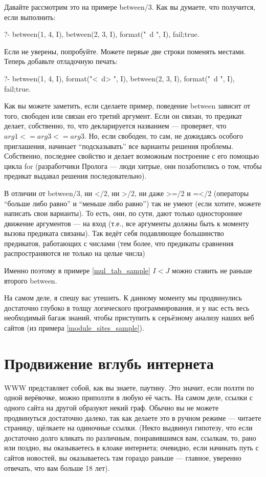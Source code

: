 \documentclass[a4paper]{book}
\def\te{т.\thinspace е.}
\begin{document}
Давайте рассмотрим это на примере between/3. Как вы думаете, что
получится, если выполнить:

\begin{example}{}{}
?-  between(1, 4, I), 
    between(2, 3, I), 
    format("~d ", I), 
    fail;true.
\end{example}

Если не уверены, попробуйте. Можете первые две строки поменять
местами. Теперь добавьте отладочную печать:

\begin{example}{}{}
?-  between(1, 4, I), 
    format("<~d> ", I),
    between(2, 3, I), 
    format("~d ", I), 
    fail;true.
\end{example}

Как вы можете заметить, если сделаете пример, поведение between
зависит от того, свободен или связан его третий аргумент. Если он
связан, то предикат делает, собственно, то, что декларируется
названием --- проверяет, что $arg1 <= arg3 <= arg3$. Но, если
свободен, то сам, не дожидаясь особого приглашения, начинает
``подсказывать'' все варианты решения проблемы. Собственно,
последнее свойство и делает возможным построение с его помощью
цикла for (разработчики Пролога --- люди хитрые, они позаботились
о том, чтобы предикат выдавал решения последовательно).

В отличии от between/3, ни </2, ни >/2, ни даже >=/2 и =</2
(операторы ``больше либо равно'' и ``меньше либо равно'') так не
умеют (если хотите, можете написать свои варианты). То есть, они,
по сути, дают только одностороннее движение аргументов --- на
вход (\te, все аргументы должны быть к моменту вызова предиката
связаны). Так ведёт себя подавляющее большинство предикатов,
работающих с числами (тем более, что предикаты сравнения
распространяются не только на целые числа)

Именно поэтому в примере \ref{mul_tab_sample} $I < J$ можно
ставить не раньше второго between.

На самом деле, я спешу вас утешить. К данному моменту мы
продвинулись достаточно глубоко в толщу логического
программирования, и у нас есть весь необходимый багаж знаний,
чтобы приступить к серьёзному анализу наших веб сайтов (из
примера \ref{module_sites_sample}).

\section{Продвижение вглубь интернета}

WWW представляет собой, как вы знаете, паутину. Это значит, если
ползти по одной верёвочке, можно приползти в любую её часть. На
самом деле, ссылки с одного сайта на другой образуют некий
граф. Обычно вы не можете продвинуться достаточно далеко, так как
делаете это в ручном режиме --- читаете страницу, щёлкаете на
одиночные ссылки. (Некто выдвинул гипотезу, что если достаточно
долго кликать по различным, понравившимся вам, ссылкам, то, рано
или поздно, вы оказываетесь в клоаке интернета; очевидно, если
начинать путь с сайтов новостей, вы оказываетесь там гораздо
раньше --- главное, уверенно отвечать, что вам больше 18 лет).
\end{document}
